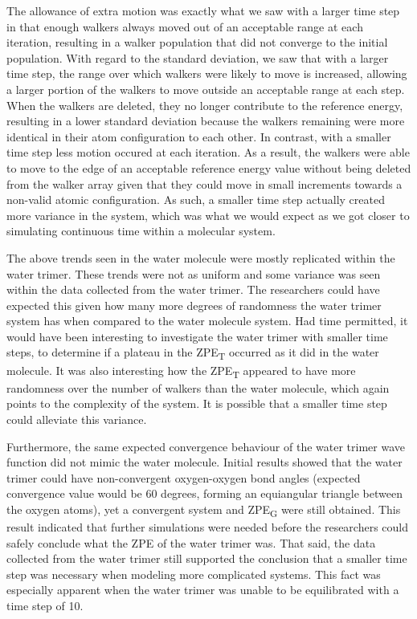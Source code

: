 \documentclass[journal=jacsat,manuscript=article]{achemso}
\begin{document}
The allowance of extra motion was exactly what we saw with a larger time step in that enough walkers always moved out of an acceptable range at each iteration, resulting in a walker population that did not converge to the initial population. With regard to the standard deviation, we saw that with a larger time step, the range over which walkers were likely to move is increased, allowing a larger portion of the walkers to move outside an acceptable range at each step. When the walkers are deleted, they no longer contribute to the reference energy, resulting in a lower standard deviation because the walkers remaining were more identical in their atom configuration to each other. In contrast, with a smaller time step less motion occured at each iteration. As a result, the walkers were able to move to the edge of an acceptable reference energy value without being deleted from the walker array given that they could move in small increments towards a non-valid atomic configuration. As such, a smaller time step actually created more variance in the system, which was what we would expect as we got closer to simulating continuous time within a molecular system. 

The above trends seen in the water molecule were mostly replicated within the water trimer. These trends were not as uniform and some variance was seen within the data collected from the water trimer. The researchers could have expected this given how many more degrees of randomness the water trimer system has when compared to the water molecule system. Had time permitted, it would have been interesting to investigate the water trimer with smaller time steps, to determine if a plateau in the ZPE\textsubscript{T} occurred as it did in the water molecule. It was also interesting how the ZPE\textsubscript{T} appeared to have more randomness over the number of walkers than the water molecule, which again points to the complexity of the system. It is possible that a smaller time step could alleviate this variance. 

Furthermore, the same expected convergence behaviour of the water trimer wave function did not mimic the water molecule. Initial results showed that the water trimer could have non-convergent oxygen-oxygen bond angles (expected convergence value would be 60 degrees, forming an equiangular triangle between the oxygen atoms), yet a convergent system and ZPE\textsubscript{G} were still obtained. This result indicated that further simulations were needed before the researchers could safely conclude what the ZPE of the water trimer was. That said, the data collected from the water trimer still supported the conclusion that a smaller time step was necessary when modeling more complicated systems. This fact was especially apparent when the water trimer was unable to be equilibrated with a time step of 10.
\end{document}
